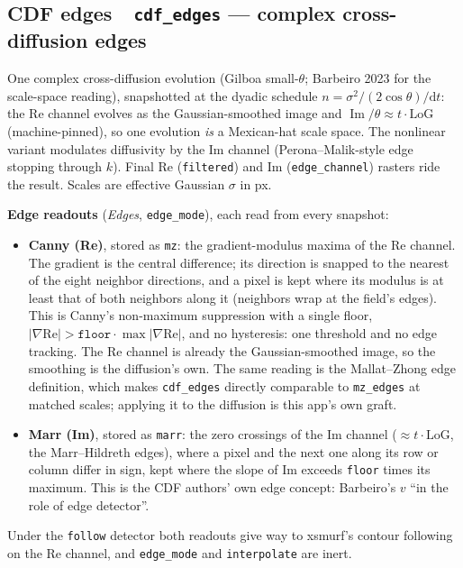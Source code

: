 \documentclass[10pt]{article}
\newcommand{\dev}[1]{\texttt{#1}}
\newcommand{\tool}[2]{#1~\textperiodcentered~\dev{#2}}
\begin{document}
\subsection{\tool{CDF edges}{cdf\_edges} --- complex cross-diffusion edges}
One complex cross-diffusion evolution (Gilboa small-$\theta$; Barbeiro 2023 for the
scale-space reading), snapshotted at the dyadic schedule
$n=\sigma^2/(2\cos\theta)/\mathrm{d}t$: the Re channel evolves as the Gaussian-smoothed
image and $\operatorname{Im}/\theta \approx t\cdot\mathrm{LoG}$ (machine-pinned), so one
evolution \emph{is} a Mexican-hat scale space. The nonlinear variant modulates diffusivity
by the Im channel (Perona--Malik-style edge stopping through $k$). Final Re (\texttt{filtered})
and Im (\texttt{edge\_channel}) rasters ride the result. Scales are effective Gaussian
$\sigma$ in px.

\textbf{Edge readouts} (\emph{Edges}, \texttt{edge\_mode}), each read from every snapshot:
\begin{itemize}\itemsep2pt
  \item \textbf{Canny (Re)}, stored as \texttt{mz}: the gradient-modulus maxima of the Re
        channel. The gradient is the central difference; its direction is snapped to the
        nearest of the eight neighbor directions, and a pixel is kept where its modulus is
        at least that of both neighbors along it (neighbors wrap at the field's edges).
        This is Canny's non-maximum suppression with a single floor,
        $|\nabla\mathrm{Re}|>\texttt{floor}\cdot\max|\nabla\mathrm{Re}|$, and no hysteresis:
        one threshold and no edge tracking. The Re channel is already the Gaussian-smoothed
        image, so the smoothing is the diffusion's own. The same reading is the Mallat--Zhong
        edge definition, which makes \dev{cdf\_edges} directly comparable to \dev{mz\_edges}
        at matched scales; applying it to the diffusion is this app's own graft.
  \item \textbf{Marr (Im)}, stored as \texttt{marr}: the zero crossings of the Im channel
        ($\approx t\cdot\mathrm{LoG}$, the Marr--Hildreth edges), where a pixel and the next
        one along its row or column differ in sign, kept where the slope of Im exceeds
        \texttt{floor} times its maximum. This is the CDF authors' own edge concept:
        Barbeiro's $v$ ``in the role of edge detector''.
\end{itemize}
Under the \texttt{follow} detector both readouts give way to xsmurf's contour following on the
Re channel, and \texttt{edge\_mode} and \texttt{interpolate} are inert.
\end{document}
